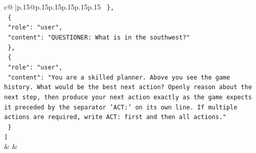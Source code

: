 \documentclass{article}
\begin{document}
{\begin{supertabular}{c@{$\;$}|p{.15\linewidth}@{}p{.15\linewidth}p{.15\linewidth}p{.15\linewidth}p{.15\linewidth}p{.15\linewidth}}
{{{\texttt{  \},} \\
\texttt{  \{} \\
\texttt{    "role": "user",} \\
\texttt{    "content": "QUESTIONER: What is in the southwest?"} \\
\texttt{  \},} \\
\texttt{  \{} \\
\texttt{    "role": "user",} \\
\texttt{    "content": "You are a skilled planner. Above you see the game history. What would be the best next action? Openly reason about the next step, then produce your next action exactly as the game expects it preceded by the separator 'ACT:' on its own line. If multiple actions are required, write ACT: first and then all actions."} \\
\texttt{  \}} \\
\texttt{{]}} \\
            }
        }
    }
    & & \\ \\


\end{supertabular}}
\end{document}

